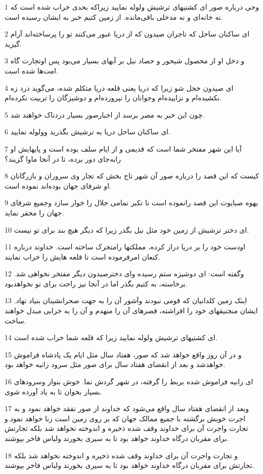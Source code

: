 \par 1 وحی درباره صور ای کشتیهای ترشیش ولوله نمایید زیراکه بحدی خراب شده است که نه خانه‌ای و نه مدخلی باقی‌مانده. از زمین کتیم خبر به ایشان رسیده است.
\par 2 ‌ای ساکنان ساحل که تاجران صیدون که از دریا عبور می‌کنند تو را پرساخته‌اند آرام گیرید.
\par 3 و دخل او از محصول شیحور و حصاد نیل بر آبهای بسیار می‌بود پس اوتجارت گاه امت‌ها شده است.
\par 4 ‌ای صیدون خجل شو زیرا که دریا یعنی قلعه دریا متکلم شده، می‌گوید درد زه نکشیده‌ام و نزاییده‌ام وجوانان را نپرورده‌ام و دوشیزگان را تربیت نکرده‌ام.
\par 5 چون این خبر به مصر برسد از اخبارصور بسیار دردناک خواهند شد.
\par 6 ‌ای ساکنان ساحل دریا به ترشیش بگذرید وولوله نمایید.
\par 7 آیا این شهر مفتخر شما است که قدیمی و از ایام سلف بوده است و پایهایش او رابه‌جای دور برده، تا در آنجا ماوا گزیند؟
\par 8 کیست که این قصد را درباره صور آن شهر تاج بخش که تجار وی سروران و بازرگانان او شرفای جهان بوده‌اند نموده است.
\par 9 یهوه صبایوت این قصد رانموده است تا تکبر تمامی جلال را خوار سازد وجمیع شرفای جهان را محقر نماید.
\par 10 ‌ای دختر ترشیش از زمین خود مثل نیل بگذر زیرا که دیگر هیچ بند برای تو نیست.
\par 11 اودست خود را بر دریا دراز کرده، مملکتها رامتحرک ساخته است. خداوند درباره کنعان امرفرموده است تا قلعه هایش را خراب نمایند.
\par 12 وگفته است: ای دوشیزه ستم رسیده و‌ای دخترصیدون دیگر مفتخر نخواهی شد. برخاسته، به کتیم بگذر اما در آنجا نیز راحت برای تو نخواهدبود.
\par 13 اینک زمین کلدانیان که قومی نبودند وآشور آن را به جهت صحرانشینان بنیاد نهاد. ایشان منجنیقهای خود را افراشته، قصرهای آن را منهدم و آن را به خرابی مبدل خواهند ساخت.
\par 14 ‌ای کشتیهای ترشیش ولوله نمایید زیرا که قلعه شما خراب شده است.
\par 15 و در آن روز واقع خواهد شد که صور، هفتاد سال مثل ایام یک پادشاه فراموش خواهدشد و بعد از انقضای هفتاد سال برای صور مثل سرود زانیه خواهد بود.
\par 16 ‌ای زانیه فراموش شده بربط را گرفته، در شهر گردش نما. خوش بنواز وسرودهای بسیار بخوان تا به یاد آورده شوی.
\par 17 وبعد از انقضای هفتاد سال واقع می‌شود که خداوند از صور تفقد خواهد نمود و به اجرت خویش برگشته با جمیع ممالک جهان که بر روی زمین است زنا خواهد نمود.و تجارت واجرت آن برای خداوند وقف شده ذخیره و اندوخته نخواهد شد بلکه تجارتش برای مقربان درگاه خداوند خواهد بود تا به سیری بخورند ولباس فاخر بپوشند.
\par 18 و تجارت واجرت آن برای خداوند وقف شده ذخیره و اندوخته نخواهد شد بلکه تجارتش برای مقربان درگاه خداوند خواهد بود تا به سیری بخورند ولباس فاخر بپوشند.
 
